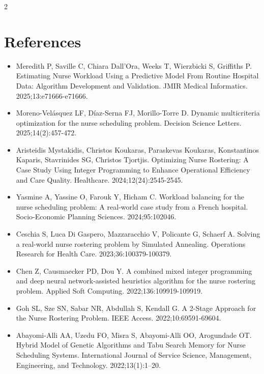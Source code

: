 \documentclass[1pt,a4paper]{article}
\begin{document}
\newpage
\begin{multicols}{2}
\section{References}

\begin{itemize}[leftmargin=*]

\item [1] Meredith P, Saville C, Chiara Dall'Ora, Weeks T, Wierzbicki S, Griffiths P. Estimating Nurse Workload Using a Predictive Model From Routine Hospital Data: Algorithm Development and Validation. JMIR Medical Informatics. 2025;13:e71666-e71666.

\item [2] Moreno-Velásquez LF, Díaz-Serna FJ, Morillo-Torre D. Dynamic multicriteria optimization for the nurse scheduling problem. Decision Science Letters. 2025;14(2):457-472.

\item [3] Aristeidis Mystakidis, Christos Koukaras, Paraskevas Koukaras, Konstantinos Kaparis, Stavrinides SG, Christos Tjortjis. Optimizing Nurse Rostering: A Case Study Using Integer Programming to Enhance Operational Efficiency and Care Quality. Healthcare. 2024;12(24):2545-2545.

\item [4] Yasmine A, Yassine O, Farouk Y, Hicham C. Workload balancing for the nurse scheduling problem: A real-world case study from a French hospital. Socio-Economic Planning Sciences. 2024;95:102046.

\item [5] Ceschia S, Luca Di Gaspero, Mazzaracchio V, Policante G, Schaerf A. Solving a real-world nurse rostering problem by Simulated Annealing. Operations Research for Health Care. 2023;36:100379-100379.

\item [6] Chen Z, Causmaecker PD, Dou Y. A combined mixed integer programming and deep neural network-assisted heuristics algorithm for the nurse rostering problem. Applied Soft Computing. 2022;136:109919-109919.

\item [7] Goh SL, Sze SN, Sabar NR, Abdullah S, Kendall G. A 2-Stage Approach for the Nurse Rostering Problem. IEEE Access. 2022;10:69591-69604.

\item [8] Abayomi-Alli AA, Uzedu FO, Misra S, Abayomi-Alli OO, Arogundade OT. Hybrid Model of Genetic Algorithms and Tabu Search Memory for Nurse Scheduling Systems. International Journal of Service Science, Management, Engineering, and Technology. 2022;13(1):1–20.


\end{itemize}
\end{multicols}
\end{document}
